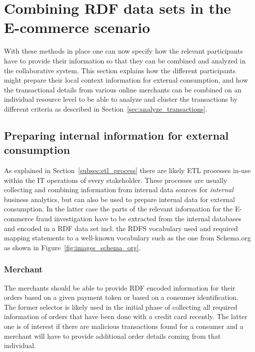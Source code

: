 
\section{Combining \gls{RDF} data sets in the \gls{E-commerce} scenario}
\label{sec:working_semantic_data}

With these methods in place one can now specify how the relevant participants have to provide their information so that they can be combined and analyzed in the collaborative system. This section explains how the different participants might prepare their local context information for external consumption, and how the transactional details from various online merchants can be combined on an individual resource level to be able to analyze and cluster the transactions by different criteria as described in Section~\ref{sec:analyze_transactions}.

\subsection{Preparing internal information for external consumption}
\label{subsec:prepare_information}

As explained in Section~\ref{subsec:etl_process} there are likely \gls{ETL} processes in-use within the \gls{IT} operations of every stakeholder. These processes are usually collecting and combining information from internal data sources for \emph{internal} business analytics, but can also be used to prepare internal data for external consumption. In the latter case the parts of the relevant information for the \gls{E-commerce} fraud investigation have to be extracted from the internal databases and encoded in a \gls{RDF} data set incl. the \gls{RDFS} vocabulary used and required mapping statements to a well-known vocabulary such as the one from Schema.org as shown in Figure~\ref{fig:images_schema_org}.

\subsubsection{Merchant}
\label{subsub:prep_info_merchant}

The merchants should be able to provide \gls{RDF} encoded information for their orders based on a given payment token or based on a consumer identification. The former selector is likely used in the initial phase of collecting all required information of orders that have been done with a credit card recently. The latter one is of interest if there are malicious transactions found for a consumer and a merchant will have to provide additional order details coming from that individual. \\

